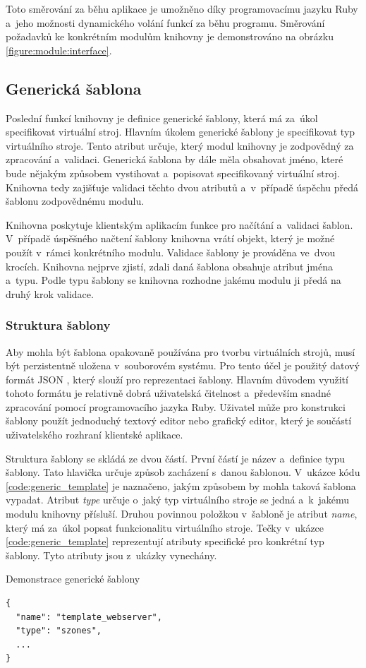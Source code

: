 Toto směrování za běhu aplikace je umožněno díky programovacímu jazyku Ruby a~jeho možnosti dynamického volání funkcí za běhu
programu. Směrování požadavků ke konkrétním modulům knihovny je demonstrováno na obrázku \ref{figure:module:interface}.
\subsection{Generická šablona}
\label{chapter:implementation:library:generic}
Poslední funkcí knihovny je definice generické šablony, která má za~úkol specifikovat virtuální stroj. Hlavním úkolem
generické šablony je specifikovat typ virtuálního stroje. Tento atribut určuje, který modul knihovny je zodpovědný
za zpracování a~validaci. Generická šablona by dále měla obsahovat jméno, které bude nějakým způsobem vystihovat a~popisovat
specifikovaný virtuální stroj. Knihovna tedy zajišťuje validaci těchto dvou atributů a~v~případě úspěchu předá
šablonu zodpovědnému modulu.

Knihovna poskytuje klientským aplikacím funkce pro načítání a~validaci šablon. V~případě úspěšného načtení šablony
knihovna vrátí objekt, který je možné použít v~rámci konkrétního modulu. Validace šablony je prováděna ve~dvou
krocích. Knihovna nejprve zjistí, zdali daná šablona obsahuje atribut jména a~typu. Podle typu šablony se knihovna rozhodne
jakému modulu ji předá na druhý krok validace.
\subsubsection{Struktura šablony}
\label{chapter:implementation:library:generic:structure}
Aby mohla být šablona opakovaně používána pro tvorbu virtuálních strojů, musí být perzistentně uložena v~souborovém systému.
Pro tento účel je použitý datový formát JSON \cite{json}, který slouží pro reprezentaci šablony. Hlavním důvodem využití tohoto
formátu je relativně dobrá uživatelská čitelnost a~především snadné zpracování pomocí programovacího jazyka Ruby. Uživatel
může pro konstrukci šablony použít jednoduchý textový editor nebo grafický editor, který je součástí uživatelského rozhraní
klientské aplikace. 

Struktura šablony se skládá ze dvou částí. První částí je název a~definice typu šablony. Tato hlavička určuje
způsob zacházení s~danou šablonou. V~ukázce kódu \ref{code:generic_template} je naznačeno, jakým způsobem by mohla taková šablona vypadat.
Atribut \textit{type} určuje o~jaký typ virtuálního stroje se jedná a~k~jakému modulu knihovny přísluší. Druhou povinnou položkou
v~šabloně je atribut \textit{name}, který má za~úkol popsat funkcionalitu virtuálního stroje. Tečky v~ukázce
\ref{code:generic_template} reprezentují atributy specifické pro konkrétní typ šablony. Tyto atributy jsou z~ukázky vynechány.
\begin{listing}[ht]
  \caption{Demonstrace generické šablony}
  \begin{verbatim}
{
  "name": "template_webserver",
  "type": "szones",
  ...
}   
  \end{verbatim} 
  \label{code:generic_template}
\end{listing}
